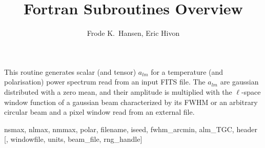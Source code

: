 
\sloppy


\title{\healpix Fortran Subroutines Overview}
 \section[create\_alm*]{ }
\label{sub:create_alm}
\author{Frode K.~Hansen, Eric Hivon}

\begin{facility}
{This routine generates scalar (and tensor) $a_{lm}$ for a temperature (and
  polarisation) power spectrum read from an input FITS
file. The $a_{lm}$ are gaussian distributed with a zero mean, and their
  amplitude is multiplied with the $\ell$-space window function of a gaussian
  beam characterized by its FWHM or an arbitrary circular beam
and a pixel window read from an external file.}
{\modAlmTools}
\end{facility}

\begin{f90format}
{nsmax, nlmax, nmmax, polar, filename, iseed, fwhm\_arcmin, alm\_TGC, header [,
windowfile, units, beam\_file, rng\_handle]}
\end{f90format}

